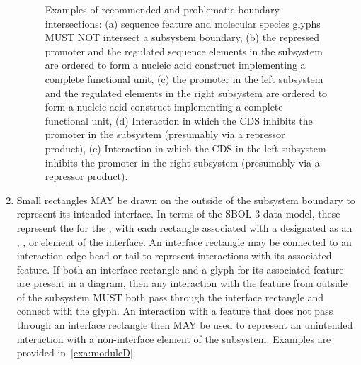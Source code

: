 \begin{enumerate}
\begin{figure}[h!]
	\caption{Examples of recommended and problematic boundary intersections: 
	(a) sequence feature and molecular species glyphs MUST NOT intersect a subsystem boundary, 
	(b) the repressed promoter and the regulated sequence elements in the subsystem are ordered to form a nucleic acid construct implementing a complete functional unit, 
	(c) the promoter in the left subsystem and the regulated elements in the right subsystem are ordered to form a nucleic acid construct implementing a complete functional unit, 
	(d) Interaction in which the CDS inhibits the promoter in the subsystem (presumably via a repressor product), 
	(e) Interaction in which the CDS in the left subsystem inhibits the promoter in the right subsystem (presumably via a repressor product).}
	\label{exa:moduleC}
	\end{figure}


\item Small rectangles MAY be drawn on the outside of the subsystem boundary to represent its intended interface.
In terms of the SBOL 3 data model, these represent the  for the , with each rectangle associated with a  designated as an , , or  element of the interface.
	An interface rectangle may be connected to an interaction edge head or tail to represent interactions with its associated feature. 
	If both an interface rectangle and a glyph for its associated feature are present in a diagram, then any interaction with the feature from outside of the subsystem MUST both pass through the interface rectangle and connect with the glyph.
	An interaction with a feature that does not pass through an interface rectangle then MAY be used to represent an unintended interaction with a non-interface element of the subsystem.
	Examples are provided in~\ref{exa:moduleD}.


\end{enumerate}

